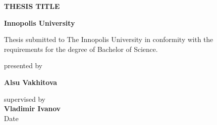 \begin{titlepage}

\begin{center}

\textbf{\Large{THESIS TITLE}}
\vspace{4cm}

\textbf{\Large Innopolis University} \\

\vspace{0.60cm}

{\Large Thesis submitted to The Innopolis University in conformity with the
requirements for the degree of Bachelor of Science.}

\vspace{6cm}

{\Large presented by}

\vspace{0.40cm}

\textbf{\Large Alsu Vakhitova}
\vspace{0.40cm}

{\Large supervised by}\\
\vspace{0.40cm}
{\bf\Large Vladimir Ivanov}\\
\vspace{0.60cm}
{\Large Date}



\end{center}
\end{titlepage}
